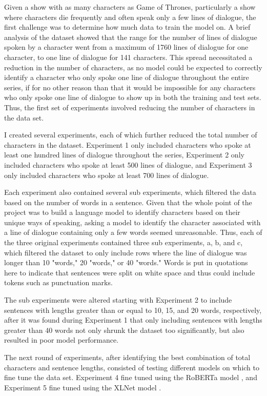 \documentclass[11pt]{article}
\begin{document}
Given a show with as many characters as Game of Thrones, particularly a show where characters die frequently and often speak only a few lines of dialogue, the first challenge was to determine how much data to train the model on. A brief analysis of the dataset showed that the range for the number of lines of dialogue spoken by a character went from a maximum of 1760 lines of dialogue for one character, to one line of dialogue for 141 characters. This spread necessitated a reduction in the number of characters, as no model could be expected to correctly identify a character who only spoke one line of dialogue throughout the entire series, if for no other reason than that it would be impossible for any characters who only spoke one line of dialogue to show up in both the training and test sets. Thus, the first set of experiments involved reducing the number of characters in the data set.

I created several experiments, each of which further reduced the total number of characters in the dataset. Experiment 1 only included characters who spoke at least one hundred lines of dialogue throughout the series, Experiment 2 only included characters who spoke at least 500 lines of dialogue, and Experiment 3 only included characters who spoke at least 700 lines of dialogue.

Each experiment also contained several sub experiments, which filtered the data based on the number of words in a sentence. Given that the whole point of the project was to build a language model to identify characters based on their unique ways of speaking, asking a model to identify the character associated with a line of dialogue containing only a few words seemed unreasonable. Thus, each of the three original experiments contained three sub experiments, a, b, and c, which filtered the dataset to only include rows where the line of dialogue was longer than 10 "words," 20 "words," or 40 "words." Words is put in quotations here to indicate that sentences were split on white space and thus could include tokens such as punctuation marks.

The sub experiments were altered starting with Experiment 2 to include sentences with lengths greater than or equal to 10, 15, and 20 words, respectively, after it was found during Experiment 1 that only including sentences with lengths greater than 40 words not only shrunk the dataset too significantly, but also resulted in poor model performance.

The next round of experiments, after identifying the best combination of total characters and sentence lengths, consisted of testing different models on which to fine tune the data set. Experiment 4 fine tuned using the RoBERTa model \cite{liu2019roberta},  and Experiment 5 fine tuned using the XLNet model \cite{yang2019xlnet}.
\end{document}
